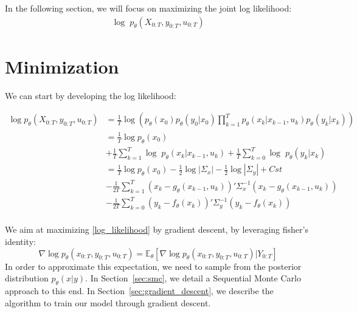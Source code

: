 \documentclass[10pt,a4paper]{report}
\begin{document}
In the following section, we will focus on maximizing the joint log likelihood:
\begin{align}
        \log \; p_{\theta}(X_{0:T}, y_{0:T}, u_{0:T})
        \label{log_likelihood}
\end{align}

\section{Minimization}
We can start by developing the log likelihood:

\begin{align*}
        \log p_{\theta}(X_{0:T}, y_{0:T}, u_{0:T}) & = \frac{1}{T} \log\left(p_\theta(x_0)p_\theta(y_0 | x_0)\prod_{k=1}^{T} p_{\theta}(x_k | x_{k-1}, u_k) p_{\theta}(y_k | x_k)\right) \\
                                                   & = \frac{1}{T} \log p_\theta(x_0)                                                                                                    \\
                                                   & + \frac{1}{T} \sum_{k=1}^{T} \log \; p_{\theta}(x_k | x_{k-1}, u_k) + \frac{1}{T} \sum_{k=0}^{T} \log \; p_{\theta}(y_k | x_k)      \\
                                                   & = \frac{1}{T} \log p_\theta(x_0) -\frac{1}{2} \log|\Sigma_x| -\frac{1}{2} \log|\Sigma_y| + Cst                                      \\
                                                   & - \frac{1}{2T} \sum_{k=1}^{T}(x_k - g_\theta(x_{k-1}, u_{k}))' \Sigma_x^{-1} (x_k - g_\theta(x_{k-1}, u_{k}))                       \\
                                                   & - \frac{1}{2T} \sum_{k=0}^{T}(y_k - f_\theta(x_k))' \Sigma_y^{-1} (y_k - f_\theta(x_k))                                             \\
\end{align*}

We aim at maximizing \ref{log_likelihood} by gradient descent, by leveraging fisher's identity:
$$
        \nabla \log p_\theta(x_{0:T}, y_{0:T}, u_{0:T}) = \mathbb{E}_\theta \left[ \nabla\log p_\theta(x_{0:T}, y_{0:T}, u_{0:T}) | Y_{0:T} \right]
$$
In order to approximate this expectation, we need to sample from the posterior distribution $p_\theta(x|y)$.
In Section~\ref{sec:smc}, we detail a Sequential Monte Carlo approach to this end.
In Section~\ref{sec:gradient_descent}, we describe the algorithm to train our model through gradient descent.
\end{document}
